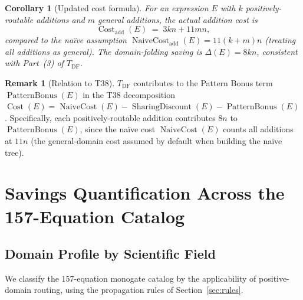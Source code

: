 \documentclass[12pt,a4paper]{article}
\newtheorem{corollary}[theorem]{Corollary}
\theoremstyle{definition}
\newtheorem{remark}[theorem]{Remark}
\newcommand{\Cost}{\operatorname{Cost}}
\newcommand{\NC}{\operatorname{NaiveCost}}
\newcommand{\SD}{\operatorname{SharingDiscount}}
\newcommand{\PB}{\operatorname{PatternBonus}}
\begin{document}
\begin{corollary}[Updated cost formula]
\label{cor:updated-cost}
For an expression $E$ with $k$ positively-routable additions and $m$ general
additions, the actual addition cost is
\[
  \Cost_{\mathrm{add}}(E) \;=\; 3kn + 11mn,
\]
compared to the na\"{i}ve assumption $\NC_{\mathrm{add}}(E) = 11(k+m)n$
(treating all additions as general).  The domain-folding saving is
$\Delta(E) = 8kn$, consistent with Part~(3) of $T_{\mathrm{DF}}$.
\end{corollary}

\begin{remark}[Relation to T38]
$T_{\mathrm{DF}}$ contributes to the Pattern Bonus term $\PB(E)$ in the T38
decomposition $\Cost(E) = \NC(E) - \SD(E) - \PB(E)$.  Specifically, each
positively-routable addition contributes $8n$ to $\PB(E)$, since the
na\"{i}ve cost $\NC(E)$ counts all additions at $11n$ (the general-domain cost
assumed by default when building the na\"{i}ve tree).
\end{remark}

\section{Savings Quantification Across the 157-Equation Catalog}
\label{sec:quantification}

\subsection{Domain Profile by Scientific Field}

We classify the 157-equation monogate catalog by the applicability of
positive-domain routing, using the propagation rules of Section~\ref{sec:rules}.
\end{document}
